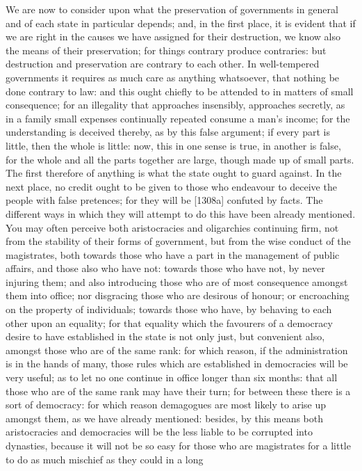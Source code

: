 We are now to consider upon what the preservation of governments in
general and of each state in particular depends; and, in the first place,
it is evident that if we are right in the causes we have assigned for
their destruction, we know also the means of their preservation; for
things contrary produce contraries: but destruction and preservation are
contrary to each other. In well-tempered governments it requires as much
care as anything whatsoever, that nothing be done contrary to law: and
this ought chiefly to be attended to in matters of small consequence; for
an illegality that approaches insensibly, approaches secretly, as in a
family small expenses continually repeated consume a man's income; for the
understanding is deceived thereby, as by this false argument; if every
part is little, then the whole is little: now, this in one sense is true,
in another is false, for the whole and all the parts together are large,
though made up of small parts. The first therefore of anything is what the
state ought to guard against. In the next place, no credit ought to be
given to those who endeavour to deceive the people with false pretences;
for they will be [1308a] confuted by facts. The different ways in which
they will attempt to do this have been already mentioned. You may often
perceive both aristocracies and oligarchies continuing firm, not from the
stability of their forms of government, but from the wise conduct of the
magistrates, both towards those who have a part in the management of
public affairs, and those also who have not: towards those who have not,
by never injuring them; and also introducing those who are of most
consequence amongst them into office; nor disgracing those who are
desirous of honour; or encroaching on the property of individuals; towards
those who have, by behaving to each other upon an equality; for that
equality which the favourers of a democracy desire to have established in
the state is not only just, but convenient also, amongst those who are of
the same rank: for which reason, if the administration is in the hands of
many, those rules which are established in democracies will be very
useful; as to let no one continue in office longer than six months: that
all those who are of the same rank may have their turn; for between these
there is a sort of democracy: for which reason demagogues are most likely
to arise up amongst them, as we have already mentioned: besides, by this
means both aristocracies and democracies will be the less liable to be
corrupted into dynasties, because it will not be so easy for those who are
magistrates for a little to do as much mischief as they could in a long
